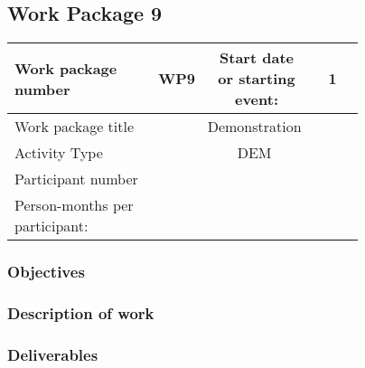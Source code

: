 \subsection{Work Package 9}

\begin{table}[hbpt]\centering
	\begin{tabular}{|p{0.35\linewidth}|p{0.06\linewidth}|p{0.06\linewidth}|p{0.06\linewidth}|
         p{0.06\linewidth}|p{0.06\linewidth}|p{0.06\linewidth}|p{0.06\linewidth}|}\hline
		 Work package number& WP9 &
		 \multicolumn{4}{|c|}{Start date or starting event:}{}&
		 \multicolumn{2}{|c|}{                        1 }{}\\\hline
		 Work package title&\multicolumn{7}{|c|}{ Demonstration }{}\\\hline
		 Activity Type&\multicolumn{7}{|c|}{      DEM }{}\\\hline
		 Participant number & ~ & ~ & ~ & ~ & ~ & ~ & ~ \\\hline
		 Person-months per participant: & ~ & ~ & ~ & ~ & ~ & ~ & ~ \\\hline
	\end{tabular}
\end{table}

\subsubsection{Objectives}

\subsubsection{Description of work}

\subsubsection{Deliverables}